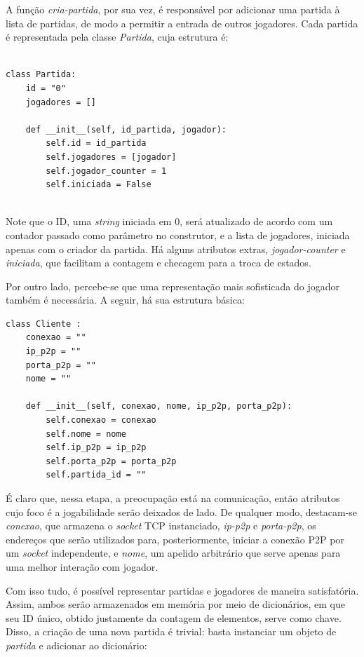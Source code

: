 \documentclass[11pt,a4paper]{article}
\begin{document}
A função \textit{cria-partida}, por sua vez, é responsável por adicionar uma partida à lista de partidas, de modo a permitir a entrada de outros jogadores. Cada partida é representada pela classe \textit{Partida}, cuja estrutura é:

\begin{verbatim}

class Partida: 
    id = "0"
    jogadores = []

    def __init__(self, id_partida, jogador):
        self.id = id_partida
        self.jogadores = [jogador]
        self.jogador_counter = 1
        self.iniciada = False
        
\end{verbatim}

Note que o ID, uma \textit{string} iniciada em 0, será atualizado de acordo com um contador passado como parâmetro no construtor, e a lista de jogadores, iniciada apenas com o criador da partida. Há alguns atributos extras, \textit{jogador-counter} e \textit{iniciada}, que facilitam a contagem e checagem para a troca de estados.

Por outro lado, percebe-se que uma representação mais sofisticada do jogador também é necessária. A seguir, há sua estrutura básica:

\begin{verbatim}
class Cliente :
    conexao = ""
    ip_p2p = ""
    porta_p2p = ""
    nome = ""

    def __init__(self, conexao, nome, ip_p2p, porta_p2p):
        self.conexao = conexao
        self.nome = nome
        self.ip_p2p = ip_p2p
        self.porta_p2p = porta_p2p
        self.partida_id = ""
\end{verbatim}

É claro que, nessa etapa, a preocupação está na comunicação, então atributos cujo foco é a jogabilidade serão deixados de lado. De qualquer modo, destacam-se \textit{conexao}, que armazena o \textit{socket} TCP instanciado, \textit{ip-p2p} e \textit{porta-p2p}, os endereços que serão utilizados para, posteriormente, iniciar a conexão P2P por um \textit{socket} independente, e \textit{nome}, um apelido arbitrário que serve apenas para uma melhor interação com jogador. 

Com isso tudo, é possível representar partidas e jogadores de maneira satisfatória. Assim, ambos serão armazenados em memória por meio de dicionários, em que seu ID único, obtido justamente da contagem de elementos, serve como chave. Disso, a criação de uma nova partida é trivial: basta instanciar um objeto de \textit{partida} e adicionar ao dicionário:
\end{document}
